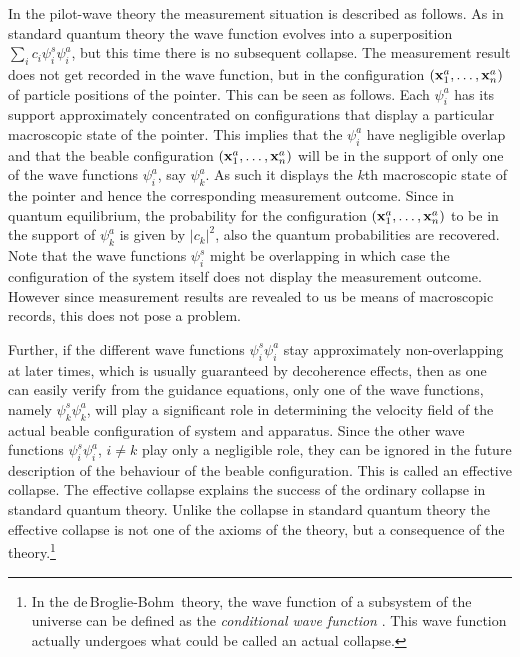 \documentclass[12pt]{article}
\newcommand{\dbb}{de$\,$Broglie-Bohm}
\begin{document}
In the pilot-wave theory the measurement situation is described as follows. As in standard quantum theory the wave function evolves into a superposition $\sum_i c_i \psi^s_i \psi^a_i$, but this time there is no subsequent collapse. The measurement result does not get recorded in the wave function, but in the configuration $({\bf x}^a_1,\dots,{\bf x}^a_n)$ of particle positions of the pointer. This can be seen as follows. Each $\psi^a_i$ has its support approximately concentrated on configurations that display a particular macroscopic state of the pointer. This implies that the $\psi^a_i$ have negligible overlap and that the beable configuration $({\bf x}^a_1,\dots,{\bf x}^a_n)$ will be in the support of only one of the wave functions $\psi^a_i$, say $\psi^a_k$. As such it displays the $k$th macroscopic state of the pointer and hence the corresponding measurement outcome. Since in quantum equilibrium, the probability for the configuration $({\bf x}^a_1,\dots,{\bf x}^a_n)$ to be in the support of $\psi^a_k$ is given by $|c_k |^2$, also the quantum probabilities are recovered. Note that the wave functions $\psi^s_i$ might be overlapping in which case the configuration of the system itself does not display the measurement outcome. However since measurement results are revealed to us be means of macroscopic records, this does not pose a problem. 

Further, if the different wave functions $\psi^s_i \psi^a_i$ stay approximately non-over\-lap\-ping at later times, which is usually guaranteed by decoherence effects, then as one can easily verify from the guidance equations, only one of the wave functions, namely $\psi^s_k \psi^a_k$, will play a significant role in determining the velocity field of the actual beable configuration of system and apparatus. Since the other wave functions $\psi^s_i \psi^a_i$, $i \neq k$ play only a negligible role, they can be ignored in the future description of the behaviour of the beable configuration. This is called an effective collapse. The effective collapse explains the success of the ordinary collapse in standard quantum theory. Unlike the collapse in standard quantum theory the effective collapse is not one of the axioms of the theory, but a consequence of the theory.{\footnote{In the \dbb\ theory, the wave function of a subsystem of the universe can be defined as the {\em conditional wave function} \cite{durr92}. This wave function actually undergoes what could be called an actual collapse.}}
\end{document}
